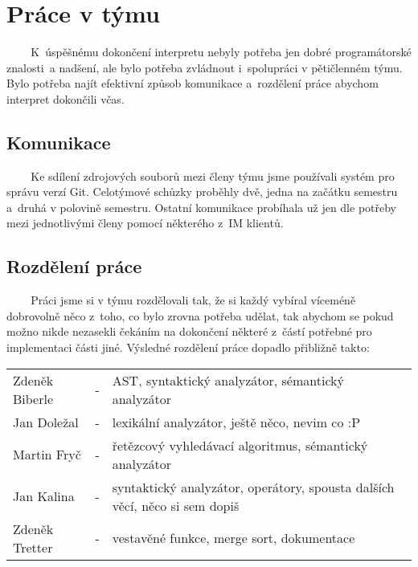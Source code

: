 \documentclass[12pt,a4paper,titlepage,final]{article}
\begin{document}
\section{Práce v týmu} \label{prace_v_tymu}
~ ~ ~K~úspěšnému dokončení interpretu nebyly potřeba jen dobré programátorské 
znalosti~a nadšení, ale bylo potřeba zvládnout i~spolupráci v pětičlenném týmu. 
Bylo potřeba najít efektivní způsob komunikace a~rozdělení práce abychom interpret
dokončili včas.
\subsection{Komunikace}
~ ~ ~Ke sdílení zdrojových souborů mezi členy týmu jsme používali systém pro 
správu verzí Git. Celotýmové schůzky proběhly dvě, jedna na začátku semestru 
a~druhá v polovině semestru. Ostatní komunikace probíhala už jen dle potřeby mezi 
jednotlivými členy pomocí některého z~IM klientů.
\subsection{Rozdělení práce}
~ ~ ~Práci jsme si v týmu rozdělovali tak, že si každý vybíral víceméně dobrovolně 
něco z~toho, co bylo zrovna potřeba udělat, tak abychom se pokud možno nikde 
nezasekli čekáním na dokončení některé z~částí potřebné pro implementaci části jiné.
\newline\newline
Výsledné rozdělení práce dopadlo přibližně takto: \medskip

\begin{tabular}{llp{12.4cm}}
Zdeněk Biberle & - & AST, syntaktický analyzátor, sémantický analyzátor\\
Jan Doležal    & - & lexikální analyzátor, ještě něco, nevim co :P\\
Martin Fryč    & - & řetězcový vyhledávací algoritmus, sémantický analyzátor\\
Jan Kalina     & - & syntaktický analyzátor, operátory, spousta dalších věcí, něco si sem dopiš\\
Zdeněk Tretter & - & vestavěné funkce, merge sort, dokumentace\\
\end{tabular}
\end{document}
